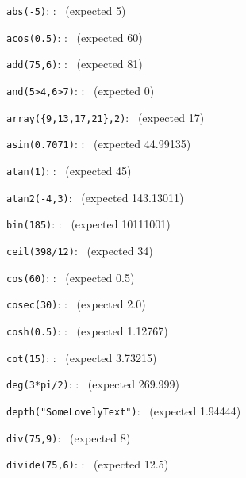 \documentclass{article}
\begin{document}
 
%

\verb|abs(-5)|:
    :
   \pgfmathresult\ (expected  5)

\verb|acos(0.5)|:
    :
   \pgfmathresult\ (expected  60)

\verb|add(75,6)|:
    :
   \pgfmathresult\ (expected  81)

\verb|and(5>4,6>7)|:
    :
   \pgfmathresult\ (expected  0)

\verb|array({9,13,17,21},2)|:
   \pgfmathresult\ (expected  17)

\verb|asin(0.7071)|:
    :
   \pgfmathresult\ (expected  44.99135)

\verb|atan(1)|:
    :
   \pgfmathresult\ (expected  45)

\verb|atan2(-4,3)|:
   \pgfmathresult\ (expected  143.13011)

\verb|bin(185)|:
    :
   \pgfmathresult\ (expected  10111001)

\verb|ceil(398/12)|:
   \pgfmathresult\ (expected  34)

\verb|cos(60)|:
    :
   \pgfmathresult\ (expected  0.5)

\verb|cosec(30)|:
    :
   \pgfmathresult\ (expected  2.0)

\verb|cosh(0.5)|:
    :
   \pgfmathresult\ (expected  1.12767)

\verb|cot(15)|:
    :
   \pgfmathresult\ (expected  3.73215)

\verb|deg(3*pi/2)|:
    :
   \pgfmathresult\ (expected  269.999)

\verb|depth("SomeLovelyText")|:
   \pgfmathresult\ (expected  1.94444)

\verb|div(75,9)|:
   \pgfmathresult\ (expected  8)

\verb|divide(75,6)|:
    :
   \pgfmathresult\ (expected  12.5)
\end{document}
